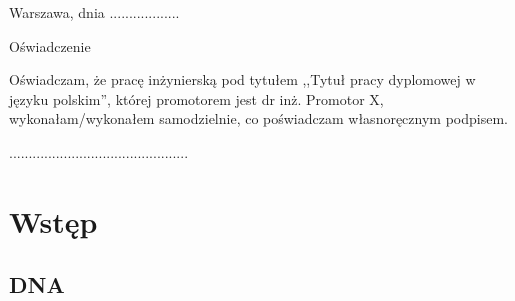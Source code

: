 \documentclass[a4paper,11pt,twoside]{report}
\theoremstyle{definition}
\newcommand{\tytul}{Tytuł pracy dyplomowej w języku polskim}
\newcommand{\type}{inżyniers} %
\newcommand{\supervisor}{dr inż. Promotor X}
\begin{document}


\null\thispagestyle{empty}\newpage

\null \hfill Warszawa, dnia ..................\\

\par\vspace{5cm}

\begin{center}
Oświadczenie
\end{center}

\indent Oświadczam, że pracę \type ką pod
tytułem ,,\tytul '', której promotorem jest \supervisor , wykonałam/wykonałem
samodzielnie, co poświadczam własnoręcznym podpisem.
\vspace{2cm}


\begin{flushright}
  \begin{minipage}{50mm}
    \begin{center}
      ..............................................

    \end{center}
  \end{minipage}
\end{flushright}

\thispagestyle{empty}
\newpage

\null\thispagestyle{empty}\newpage


\tableofcontents
\thispagestyle{empty}

\newpage %

\null\thispagestyle{empty}\newpage
\pagestyle{fancy}
\setcounter{page}{11} %

\chapter*{Wstęp}

\section*{DNA}
\end{document}
